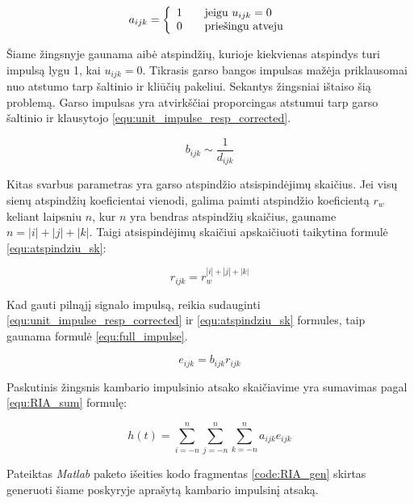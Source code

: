 \documentclass[]{vgtuef}
\begin{document}
{\begin{equation}
a_{ijk}= \left\{
  \begin{array}{l l}
    1 & \quad \text{jeigu $u_{ijk} = 0$}\\
    0 & \quad \text{priešingu atveju}\\
  \end{array} \right.
\label{equ:unit_impulse_resp_funct}
\end{equation}

Šiame žingsnyje gaunama aibė atspindžių, kurioje kiekvienas atspindys turi impulsą lygu 1, kai $u_{ijk}=0$. Tikrasis garso bangos impulsas mažėja priklausomai nuo atstumo tarp šaltinio ir kliūčių pakeliui. Sekantys žingsniai ištaiso šią problemą. Garso impulsas yra atvirkščiai proporcingas atstumui tarp garso šaltinio ir klausytojo \ref{equ:unit_impulse_resp_corrected}.

\begin{equation}
b_{ijk}	\sim\frac{1}{d_{ijk}}
\label{equ:unit_impulse_resp_corrected}
\end{equation}

Kitas svarbus parametras yra garso atspindžio atsispindėjimų skaičius. Jei visų sienų atspindžių koeficientai vienodi, galima paimti atspindžio koeficientą $r_{w}$ keliant laipsniu $n$, kur $n$ yra bendras atspindžių skaičius, gauname $n=|i|+|j|+|k|$. Taigi atsispindėjimų skaičiui apskaičiuoti taikytina formulė \ref{equ:atspindziu_sk}:

\begin{equation}
r_{ijk}	= r_{w}^{|i|+|j|+|k|}
\label{equ:atspindziu_sk}
\end{equation}

Kad gauti pilnąjį signalo impulsą, reikia sudauginti \ref{equ:unit_impulse_resp_corrected} ir \ref{equ:atspindziu_sk} formules, taip gaunama formulė \ref{equ:full_impulse}.

\begin{equation}
e_{ijk}	= b_{ijk} r_{ijk}
\label{equ:full_impulse}
\end{equation}

Paskutinis žingsnis kambario impulsinio atsako skaičiavime yra sumavimas pagal \ref{equ:RIA_sum} formulę:

\begin{equation}
h(t) = \sum_{i=-n}^{n}\sum_{j=-n}^{n}\sum_{k=-n}^{n} a_{ijk} e_{ijk}
\label{equ:RIA_sum}
\end{equation}

Pateiktas \textit{Matlab} paketo išeities kodo fragmentas \ref{code:RIA_gen} skirtas generuoti šiame poskyryje aprašytą kambario impulsinį atsaką.

}
\end{document}
